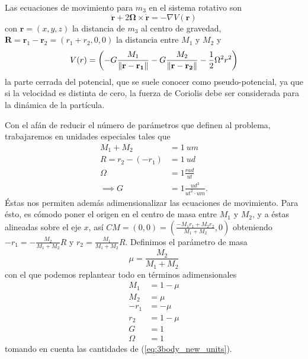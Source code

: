 Las ecuaciones de movimiento para $m_3$ en el sistema rotativo son
\begin{equation}
 \ddot{\mathbf{r}} + 2\mathbf{\Omega} \times \dot{\mathbf{r}} = - \nabla V(\mathbf{r})
 \label{eq:3body_restricted_acceleration}
\end{equation}
con $\mathbf{r} = (x,y,z)$ la distancia de $m_3$ al centro de gravedad, $\mathbf{R} = \mathbf{r}_1 - \mathbf{r}_2 = (r_1 + r_2,0,0)$ la distancia entre $M_1$ y $M_2$ y
\begin{equation}
 V(r) = \left( -G \frac{M_1}{\left\lVert\mathbf{r}-\mathbf{r_1}\right\rVert} - G \frac{M_2}{\left\lVert\mathbf{r}-\mathbf{r_2}\right\rVert} - \frac{1}{2} \Omega^2 r^2 \right)
 \label{eq:3body_restricted_potential}
\end{equation} 
la parte cerrada del potencial, que se suele conocer como pseudo-potencial, ya que si la velocidad es distinta de cero, la fuerza de Coriolis debe ser considerada para la dinámica de la partícula.

Con el afán de reducir el número de parámetros que definen al problema, trabajaremos en unidades especiales tales que 
\begin{align}
 M_1 + M_2 &= 1 \ um \nonumber \\
 R = r_2 - (-r_1) &= 1 \ ud \nonumber \\
 \Omega &= 1 \frac{rad}{ut} \nonumber \\
 \implies G &= 1 \frac{ud^3}{ut^2 \cdot um}. \label{eq:3body_new_units}
\end{align}
Éstas nos permiten además adimensionalizar las ecuaciones de movimiento. Para ésto, es cómodo poner el origen en el centro de masa entre $M_1$ y $M_2$, y a éstas alineadas sobre el eje $x$, así $CM = (0,0) = (\frac{-M_1r_1 + M_2r_2}{M_1 + M_2}, 0)$ obteniendo $-r_1 = -\frac{M_2}{M_1+M_2}R$ y $r_2 =\frac{M_1}{M_1+M_2}R$. Definimos el parámetro de masa 
\begin{equation*}
 \mu = \frac{M_2}{M_1 + M_2} 
\end{equation*}
con el que podemos replantear todo en términos adimensionales
\begin{align}
 M_1 &= 1 - \mu \nonumber \\
 M_2 &= \mu \nonumber \\
 -r_1 &= -\mu \nonumber \\
 r_2 &= 1 - \mu \nonumber \\
 G &= 1 \nonumber \\
 \Omega &= 1
 \label{eq:3body_adimensional_units}
\end{align}
tomando en cuenta las cantidades de (\ref{eq:3body_new_units}).

